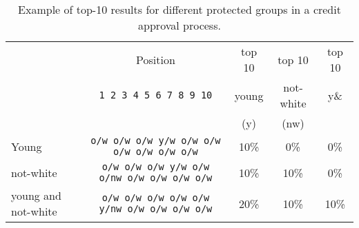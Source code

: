 \begin{table}[t]
	\caption{Example of top-10 results for different protected groups in a credit approval process.
		\label{tbl:multinomial_intro_example}}
	
	\centering\small\begin{tabular}{lcccc}\toprule
		& Position					  & top 10 & top 10  & top 10 \\
		& \texttt{1 2 3 4 5 6 7 8 9 10} & young & not-white & y\& \\
		&                               &  (y)  & (nw)  &  \nw \\
		\midrule
		Young  & \texttt{o/w o/w o/w y/w o/w o/w o/w o/w o/w o/w} & 10\% & 0\% & 0\% \\
		not-white & \texttt{o/w o/w o/w y/w o/w o/nw o/w o/w o/w o/w} & 10\% & 10\% & 0\% \\
		young and not-white & \texttt{o/w o/w o/w o/w o/w y/nw o/w o/w o/w o/w} & 20\% & 10\% & 10\% \\
		\bottomrule
	\end{tabular}
	
\end{table}


